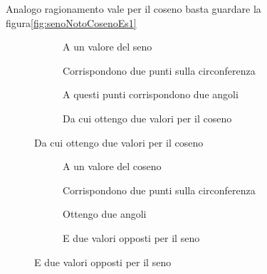 Analogo ragionamento vale per il coseno basta guardare la figura\nobs\vref{fig:senoNotoCosenoEs1}
\begin{figure}
	\begin{subfigure}[b]{.5\linewidth}
		\centering
			\caption{A un valore del seno}\label{fig:CosenoNotoSeno1}
	\end{subfigure}%
	\begin{subfigure}[b]{.5\linewidth}
		\centering
			\caption{Corrispondono due punti sulla circonferenza}\label{fig:CosenoNotoSeno2}
	\end{subfigure}
	\begin{subfigure}[b]{.5\linewidth}
		\centering
			\caption{A questi punti corrispondono due angoli}\label{fig:CosenoNotoSeno3}
	\end{subfigure}%
	\begin{subfigure}[b]{.5\linewidth}
		\centering
			\caption{Da cui ottengo due valori per il coseno}\label{fig:CosenoNotoSeno4}
	\end{subfigure}
	\label{fig:CosenoNotoSenoEs1}
\end{figure}
\begin{figure}
	\begin{subfigure}[b]{.5\linewidth}
		\centering
	\caption{A un valore del coseno}\label{fig:senoNotoCoseno1}
	\end{subfigure}%
	\begin{subfigure}[b]{.5\linewidth}
		\centering
		\caption{Corrispondono due punti sulla circonferenza}\label{fig:senoNotoCoseno2}
	\end{subfigure}
	\begin{subfigure}[b]{.5\linewidth}
		\centering
		\caption{Ottengo due angoli}\label{fig:senoNotoCoseno3}
	\end{subfigure}%
	\begin{subfigure}[b]{.5\linewidth}
		\centering
		\caption{E due valori opposti per il seno}\label{fig:senoNotoCoseno4}
	\end{subfigure}
	\label{fig:senoNotoCosenoEs1}
\end{figure}
